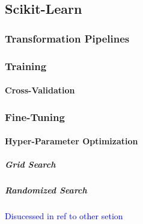 \subsection{Scikit-Learn}


\subsubsection{Transformation Pipelines}


\subsubsection{Training}

\paragraph{Cross-Validation}

\subsubsection{Fine-Tuning}

\paragraph{Hyper-Parameter Optimization}

\subparagraph{Grid Search}

\subparagraph{Randomized Search}

\textcolor{blue}{Disucessed in ref to other setion}